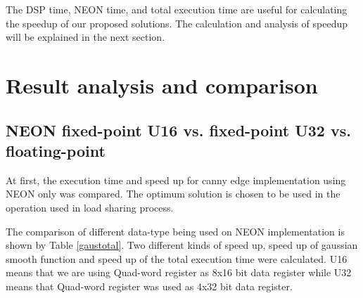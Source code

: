 \documentclass[conference]{IEEEtran}
\begin{document}
The DSP time, NEON time, and total execution time are useful for calculating the speedup of our proposed solutions. The calculation and analysis of speedup will be explained in the next section.





\section{Result analysis and comparison}

\subsection{NEON fixed-point U16 vs. fixed-point U32 vs. floating-point}

At first, the execution time and speed up for canny edge implementation using NEON only was compared. The optimum solution is chosen to be used in the operation used in load sharing process.

The comparison of different data-type being used on NEON implementation is shown by Table \ref{gaustotal}. Two different kinds of speed up, speed up of gaussian smooth function and speed up of the total execution time were calculated. U16 means that we are using Quad-word register as 8x16 bit data register while U32 means that Quad-word register was used as 4x32 bit data register.
\end{document}
